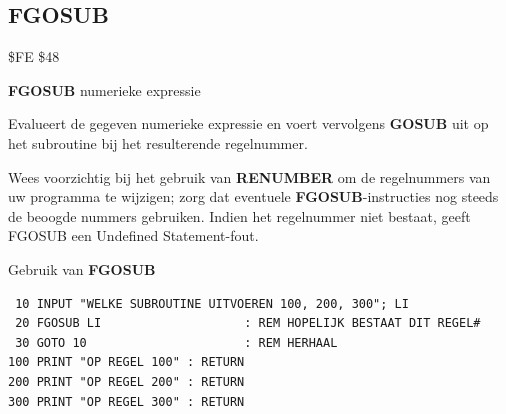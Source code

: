 
\newpage
\subsection{FGOSUB}
\begin{description}[leftmargin=2cm,style=nextline]
\item [Token:]    \$FE \$48

\item [Formaat:]   {\bf FGOSUB} numerieke expressie

\item [Gebruik:]    Evalueert de gegeven numerieke expressie en voert vervolgens {\bf GOSUB} uit op het subroutine bij het resulterende regelnummer.

\item [Opmerkingen:]  Wees voorzichtig bij het gebruik van {\bf RENUMBER} om de regelnummers van uw programma te wijzigen; zorg dat eventuele {\bf FGOSUB}-instructies nog steeds de beoogde nummers gebruiken. Indien het regelnummer niet bestaat, geeft FGOSUB een Undefined Statement-fout.

\item [Voorbeeld:]  Gebruik van {\bf FGOSUB}

\begin{tcolorbox}[colback=black,coltext=white]
\verbatimfont{\codefont}
\begin{verbatim}
 10 INPUT "WELKE SUBROUTINE UITVOEREN 100, 200, 300"; LI
 20 FGOSUB LI                    : REM HOPELIJK BESTAAT DIT REGEL#
 30 GOTO 10                      : REM HERHAAL
100 PRINT "OP REGEL 100" : RETURN
200 PRINT "OP REGEL 200" : RETURN
300 PRINT "OP REGEL 300" : RETURN
\end{verbatim}
\end{tcolorbox}
\end{description}


\newpage
